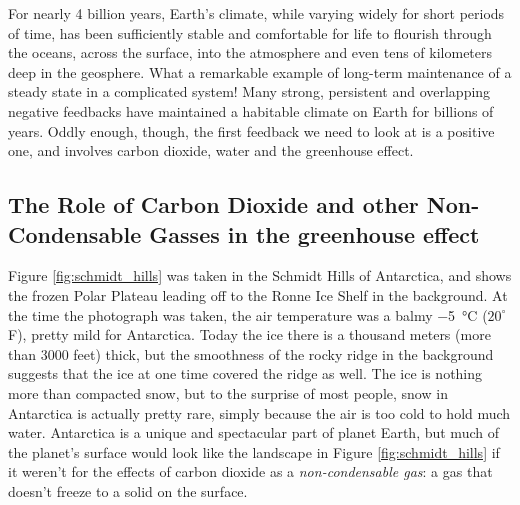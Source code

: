 For nearly 4 billion years, Earth's climate, while varying widely for short periods of time, has been sufficiently stable and comfortable for life to flourish through the oceans, across the surface, into the atmosphere and even tens of kilometers deep in the geosphere. What a remarkable example of long-term maintenance of a steady state in a complicated system! Many strong, persistent and overlapping negative feedbacks have maintained a habitable climate on Earth for billions of years. Oddly enough, though, the first feedback we need to look at is a positive one, and involves carbon dioxide, water and the greenhouse effect.

\subsection{The Role of Carbon Dioxide and other Non-Condensable Gasses in the greenhouse effect}
Figure \ref{fig:schmidt_hills} was taken in the Schmidt Hills of Antarctica, and shows the frozen Polar Plateau leading off to the Ronne Ice Shelf in the background. At the time the photograph was taken, the air temperature was a balmy \SI{-5}{\celsius} ($20^{\circ}$ F), pretty mild for Antarctica. Today the ice there is a thousand meters (more than 3000 feet) thick, but the smoothness of the rocky ridge in the background suggests that the ice at one time covered the ridge as well. The ice is nothing more than compacted snow, but to the surprise of most people, snow in Antarctica is actually pretty rare, simply because the air is too cold to hold much water. Antarctica is a unique and spectacular part of planet Earth, but much of the planet's surface would look like the landscape in Figure \ref{fig:schmidt_hills} if it weren't for the effects of carbon dioxide as a \emph{non-condensable gas}: a gas that doesn't freeze to a solid on the surface. 

